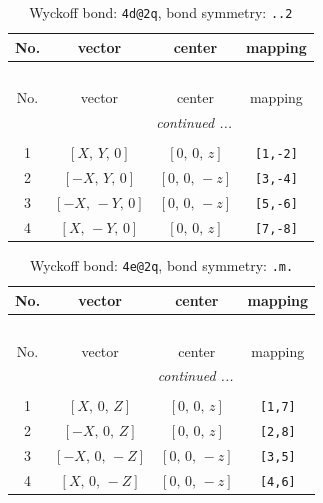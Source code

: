 \documentclass[fleqn,8pt]{jsarticle}
\begin{document}
\begin{longtable}{cccc}
\caption{Wyckoff bond: {\tt 4d@2q}, bond symmetry: {\tt ..2}}
 \\
 \hline \hline
No. & vector & center & mapping \\ \hline \endfirsthead

\multicolumn{3}{l}{\tablename\ \thetable{}} \\
 \hline \hline
No. & vector & center & mapping \\ \hline \endhead

 \hline \hline
\multicolumn{3}{r}{\footnotesize\it continued ...} \\ \endfoot

 \hline \hline
\multicolumn{3}{r}{} \\ \endlastfoot

1 & $\left[ X,\, Y,\, 0 \right]$ & $\left[ 0,\, 0,\, z \right]$ & {\tt [1,-2]} \\ \hline
2 & $\left[ - X,\, Y,\, 0 \right]$ & $\left[ 0,\, 0,\, - z \right]$ & {\tt [3,-4]} \\ \hline
3 & $\left[ - X,\, - Y,\, 0 \right]$ & $\left[ 0,\, 0,\, - z \right]$ & {\tt [5,-6]} \\ \hline
4 & $\left[ X,\, - Y,\, 0 \right]$ & $\left[ 0,\, 0,\, z \right]$ & {\tt [7,-8]} \\
\end{longtable}
\renewcommand{\arraystretch}{1.2}
\begin{longtable}{cccc}
\caption{Wyckoff bond: {\tt 4e@2q}, bond symmetry: {\tt .m.}}
 \\
 \hline \hline
No. & vector & center & mapping \\ \hline \endfirsthead

\multicolumn{3}{l}{\tablename\ \thetable{}} \\
 \hline \hline
No. & vector & center & mapping \\ \hline \endhead

 \hline \hline
\multicolumn{3}{r}{\footnotesize\it continued ...} \\ \endfoot

 \hline \hline
\multicolumn{3}{r}{} \\ \endlastfoot

1 & $\left[ X,\, 0,\, Z \right]$ & $\left[ 0,\, 0,\, z \right]$ & {\tt [1,7]} \\ \hline
2 & $\left[ - X,\, 0,\, Z \right]$ & $\left[ 0,\, 0,\, z \right]$ & {\tt [2,8]} \\ \hline
3 & $\left[ - X,\, 0,\, - Z \right]$ & $\left[ 0,\, 0,\, - z \right]$ & {\tt [3,5]} \\ \hline
4 & $\left[ X,\, 0,\, - Z \right]$ & $\left[ 0,\, 0,\, - z \right]$ & {\tt [4,6]} \\
\end{longtable}
\end{document}
